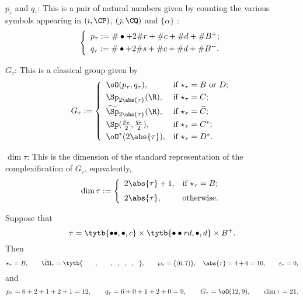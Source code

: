 \documentclass[ssunip.tex]{subfiles}
\begin{document}
 \smallskip


 \smallskip



  \noindent $p_{\tau}$ and $q_\tau$: This is a pair of natural numbers given by counting  the various symbols appearing in $(\imath, \CP)$, $(\jmath, \CQ)$ and $\{\alpha\}$ :
  \[
  \left\{
     \begin{array}{l}
    p_\tau := \# \bullet+ 2 \# r + \# c + \# d + \# B^+;\smallskip\\
    q_\tau := \# \bullet+ 2 \# s + \# c + \# d + \# B^-.\\
    \end{array}
    \right.
\]

\smallskip


 \smallskip


  \noindent $G_{\tau}$: This is a classical group given by
  \[
 G_\tau:= \left\{
     \begin{array}{ll}
         \oO(p_\tau, q_\tau), &\hbox{if $\star_\tau=B$ or $D$}; \smallskip\\
            \Sp_{2\abs{\tau}}(\R), &\hbox{if $\star_\tau=C$}; \smallskip\\
           \widetilde{\Sp}_{2\abs{\tau}}(\R), &\hbox{if $\star_\tau=\widetilde{ C}$}; \smallskip \\
        \Sp(\frac{p_\tau}{2}, \frac{q_\tau}{2}), &\hbox{if $\star_\tau=C^*$}; \smallskip \\
          \oO^*(2\abs{\tau}), &\hbox{if $\star_\tau=D^*$}.\\
            \end{array}
   \right.
\]

\smallskip


 \smallskip

  \noindent $\dim \tau$:
This is the dimension of the standard representation of the complexification of $G_\tau$, equvalently,
 \[
 \dim \tau:= \left\{
     \begin{array}{ll}
          2\abs{ \tau}+1, &\hbox{if $\star_\tau=B$}; \medskip\\
         2 \abs{\tau}, &\hbox{otherwise}.
            \end{array}
   \right.
 \]


 \smallskip

\begin{Example} Suppose that
\[
\tau= \tytb{\bullet \bullet ,\bullet , c } \times \tytb{\bullet \bullet r d ,\bullet , d }\times B^+.
\]
Then
\[
\star_\tau=B, \qquad \check \CO_\tau =\tytb{\ \ \ \ \ \ , \ \ \ \ \ \ , \ \ , \ \ , \ \ , \ \  },  \qquad \wp_\tau=\{(6,7)\}, \quad \abs{\tau}=4+6=10, \qquad \varepsilon_\tau=0,
\]
and
\[
 p_\tau=6+2+1+2+1=12, \qquad q_\tau=6+0+1+2+0=9, \qquad G_\tau=\oO(12,9), \qquad \dim \tau=21.
 \]
\end{Example}
\end{document}
